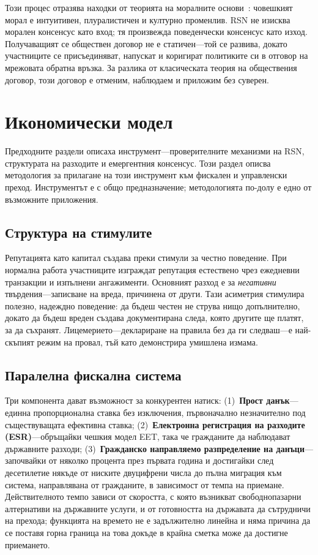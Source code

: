 \documentclass[11pt,a4paper,twocolumn]{article}
\begin{document}
Този процес отразява находки от теорията на моралните основи~\cite{haidt2012}: човешкият морал е интуитивен, плуралистичен и културно променлив. RSN не изисква морален консенсус като вход; тя произвежда поведенчески консенсус като изход. Получаващият се обществен договор не е статичен---той се развива, докато участниците се присъединяват, напускат и коригират политиките си в отговор на мрежовата обратна връзка. За разлика от класическата теория на обществения договор, този договор е отменим, наблюдаем и приложим без суверен.

\section{Икономически модел}

Предходните раздели описаха инструмент---проверителните механизми на RSN, структурата на разходите и емергентния консенсус. Този раздел описва методология за прилагане на този инструмент към фискален и управленски преход. Инструментът е с общо предназначение; методологията по-долу е едно от възможните приложения.

\subsection{Структура на стимулите}

Репутацията като капитал създава преки стимули за честно поведение. При нормална работа участниците изграждат репутация естествено чрез ежедневни транзакции и изпълнени ангажименти. Основният разход е за \emph{негативни} твърдения---записване на вреда, причинена от други. Тази асиметрия стимулира полезно, надеждно поведение: да бъдеш честен не струва нищо допълнително, докато да бъдеш вреден създава документирана следа, която другите ще платят, за да съхранят. Лицемерието---деклариране на правила без да ги следваш---е най-скъпият режим на провал, тъй като демонстрира умишлена измама.

\subsection{Паралелна фискална система}

Три компонента дават възможност за конкурентен натиск: (1)~\textbf{Прост данък}---единна пропорционална ставка без изключения, първоначално незначително под съществуващата ефективна ставка; (2)~\textbf{Електронна регистрация на разходите (ESR)}---обръщайки чешкия модел EET, така че гражданите да наблюдават държавните разходи; (3)~\textbf{Гражданско направляемо разпределение на данъци}---започвайки от няколко процента през първата година и достигайки след десетилетие някъде от ниските двуцифрени числа до пълна миграция към система, направлявана от гражданите, в зависимост от темпа на приемане. Действителното темпо зависи от скоростта, с която възникват свободнопазарни алтернативи на държавните услуги, и от готовността на държавата да сътрудничи на прехода; функцията на времето не е задължително линейна и няма причина да се поставя горна граница на това докъде в крайна сметка може да достигне приемането.
\end{document}
